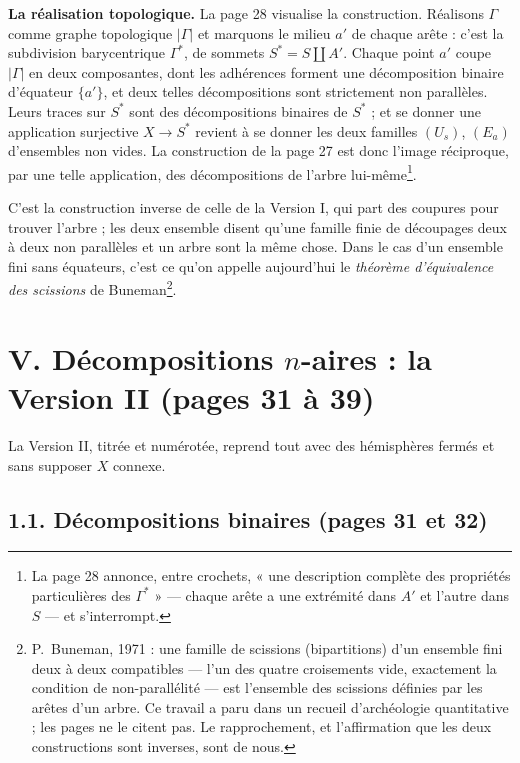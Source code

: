 \documentclass[11pt,a4paper]{article}
\begin{document}
\textbf{La réalisation topologique.} La page 28 visualise la construction.
Réalisons $\Gamma$ comme graphe topologique $|\Gamma|$ et marquons le milieu
$a'$ de chaque arête : c'est la subdivision barycentrique $\Gamma^{*}$, de
sommets $S^{*} = S \amalg A'$. Chaque point $a'$ coupe $|\Gamma|$ en deux
composantes, dont les adhérences forment une décomposition binaire
d'équateur $\{a'\}$, et deux telles décompositions sont strictement non
parallèles. Leurs traces sur $S^{*}$ sont des décompositions binaires de
$S^{*}$ ; et se donner une application surjective $X \to S^{*}$ revient à se
donner les deux familles $(U_s)$, $(E_a)$ d'ensembles non vides. La
construction de la page 27 est donc l'image réciproque, par une telle
application, des décompositions de l'arbre lui-même\footnote{La page 28
annonce, entre crochets, « une description complète des propriétés
particulières des $\Gamma^{*}$ » --- chaque arête a une extrémité dans $A'$
et l'autre dans $S$ --- et s'interrompt.}.

C'est la construction inverse de celle de la Version I, qui part des
coupures pour trouver l'arbre ; les deux ensemble disent qu'une famille
finie de découpages deux à deux non parallèles et un arbre sont la même
chose. Dans le cas d'un ensemble fini sans équateurs, c'est ce qu'on appelle
aujourd'hui le \emph{théorème d'équivalence des scissions} de
Buneman\footnote{P.~Buneman, 1971 : une famille de scissions (bipartitions)
d'un ensemble fini deux à deux compatibles --- l'un des quatre croisements
vide, exactement la condition de non-parallélité --- est l'ensemble des
scissions définies par les arêtes d'un arbre. Ce travail a paru dans un
recueil d'archéologie quantitative ; les pages ne le citent pas. Le rapprochement, et l'affirmation que les deux constructions
sont inverses, sont de nous.}.

\section*{V. Décompositions $n$-aires : la Version II (pages 31 à 39)}

La Version II, titrée et numérotée, reprend tout avec des
hémisphères fermés et sans supposer $X$ connexe.

\subsection*{1.1. Décompositions binaires (pages 31 et 32)}
\end{document}
